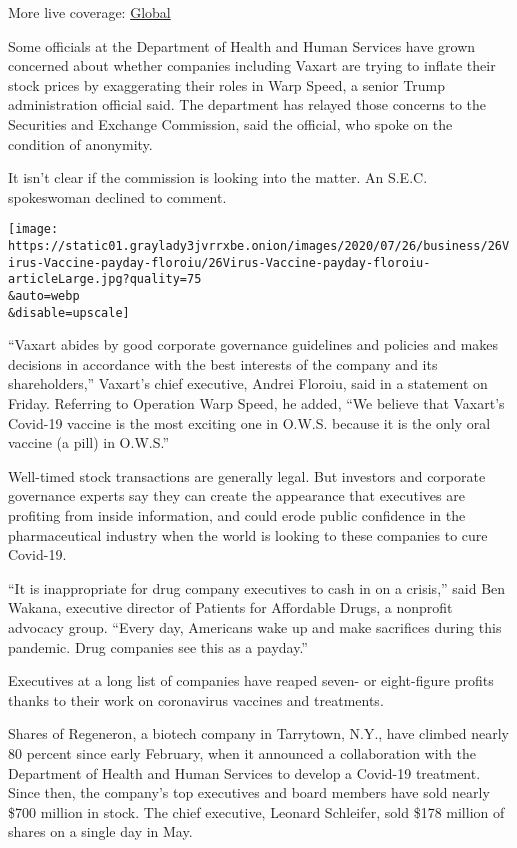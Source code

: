 More live coverage:
\href{https://www.nytimes3xbfgragh.onion/2020/08/04/world/coronavirus-cases.html?action=click\&pgtype=Article\&state=default\&region=MAIN_CONTENT_1\&context=storylines_live_updates}{Global}

Some officials at the Department of Health and Human Services have grown
concerned about whether companies including Vaxart are trying to inflate
their stock prices by exaggerating their roles in Warp Speed, a senior
Trump administration official said. The department has relayed those
concerns to the Securities and Exchange Commission, said the official,
who spoke on the condition of anonymity.

It isn't clear if the commission is looking into the matter. An S.E.C.
spokeswoman declined to comment.

\texttt{[image: https://static01.graylady3jvrrxbe.onion/images/2020/07/26/business/26Virus-Vaccine-payday-floroiu/26Virus-Vaccine-payday-floroiu-articleLarge.jpg?quality=75\\\&auto=webp\\\&disable=upscale]}

``Vaxart abides by good corporate governance guidelines and policies and
makes decisions in accordance with the best interests of the company and
its shareholders,'' Vaxart's chief executive, Andrei Floroiu, said in a
statement on Friday. Referring to Operation Warp Speed, he added, ``We
believe that Vaxart's Covid-19 vaccine is the most exciting one in
O.W.S. because it is the only oral vaccine (a pill) in O.W.S.''

Well-timed stock transactions are generally legal. But investors and
corporate governance experts say they can create the appearance that
executives are profiting from inside information, and could erode public
confidence in the pharmaceutical industry when the world is looking to
these companies to cure Covid-19.

``It is inappropriate for drug company executives to cash in on a
crisis,'' said Ben Wakana, executive director of Patients for Affordable
Drugs, a nonprofit advocacy group. ``Every day, Americans wake up and
make sacrifices during this pandemic. Drug companies see this as a
payday.''

Executives at a long list of companies have reaped seven- or
eight-figure profits thanks to their work on coronavirus vaccines and
treatments.

Shares of Regeneron, a biotech company in Tarrytown, N.Y., have climbed
nearly 80 percent since early February, when it announced a
collaboration with the Department of Health and Human Services to
develop a Covid-19 treatment. Since then, the company's top executives
and board members have sold nearly \$700 million in stock. The chief
executive, Leonard Schleifer, sold \$178 million of shares on a single
day in May.

